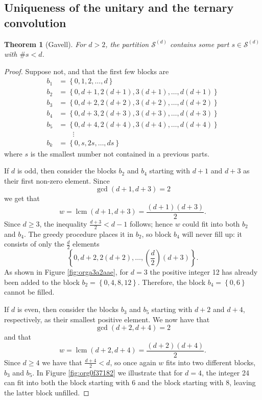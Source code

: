 \documentclass[12pt]{article}
\theoremstyle{definition}
\theoremstyle{remark}
\theoremstyle{plain}
\newtheorem{theorem}[lemma]{Theorem}
\newcommand{\set}[1]{\left\{{#1}\right\}}
\newcommand{\gpartition}[1]{\mathcal{S}^{(#1)}}
\newcommand{\lcm}{\operatorname{lcm}}
\begin{document}
\subsection{Uniqueness of the unitary and the ternary convolution}
\label{sec:org8d3cb47}
\begin{theorem}[Gavell]
For \(d > 2\), the partition \(\gpartition{d}\) contains some part \(s \in \gpartition{d}\) with
\(\#s < d\).
\label{org1191dce}
\end{theorem}
\begin{proof}
Suppose not, and that the first few blocks are
\begin{equation}
\label{eq:org688900a}
\begin{split}
b_{1} & = \set{0, 1, 2, \dots, d} \\
b_{2} & = \set{0, d+1, 2(d+1), 3(d+1), \dots, d(d+1)} \\
b_{3} & = \set{0, d+2, 2(d+2), 3(d+2), \dots, d(d+2)} \\
b_{4} & = \set{0, d+3, 2(d+3), 3(d+3), \dots, d(d+3)} \\
b_{5} & = \set{0, d+4, 2(d+4), 3(d+4), \dots, d(d+4)} \\
   &  \qquad \vdots \\
  b_{k} & = \set{0, s, 2s, \dots, ds}
\end{split}
\end{equation}
where \(s\) is the smallest number not contained in a previous parts.

If \(d\) is odd, then consider the blocks \(b_{2}\) and \(b_{4}\) starting with \(d+1\) and \(d+3\) as their
first non-zero element. Since
\[\gcd(d+1,d+3)=2\] we get that
\[w=\lcm(d+1,d+3)=\frac{(d+1)(d+3)}{2}.\]
Since \(d \ge 3\), the inequality \(\frac{d+3}{2} < d-1\) follows; hence \(w\) could fit into both
\(b_{2}\) and \(b_{4}\).
The greedy procedure places it in \(b_{2}\), so block \(b_{4}\) will never fill up:
it consists of only the \(\frac{d}{2}\) elements
\[\set{0,d+2, 2(d+2), \dots ,(\frac{d}{2})(d+3)}.\]
As shown in Figure \ref{fig:orga3a2aae}, for \(d=3\) the
positive integer 12 has already been added to the block \(b_{2}=\set{0,4,8,12}\).
Therefore, the block \(b_{4} = \set{0,6}\) cannot be filled.

If \(d\) is even, then consider the blocks \(b_{3}\) and \(b_{5}\) starting with \(d+2\) and \(d+4\), respectively,
as their smallest positive element. We now have that \[\gcd(d+2,d+4)=2\] and that
\[w=\lcm(d+2,d+4) = \frac{(d+2)(d+4)}{2}.\]
Since \(d \ge 4\) we have that \(\frac{d+4}{2} < d\), so once again
\(w\) fits into two different blocks, \(b_{3}\) and \(b_{5}\).
In Figure \ref{fig:org0f37182} we illustrate that for \(d=4\), the integer 24 can fit into both
the block starting with \(6\) and the block starting with \(8\), leaving the latter block unfilled.
\end{proof}
\end{document}
